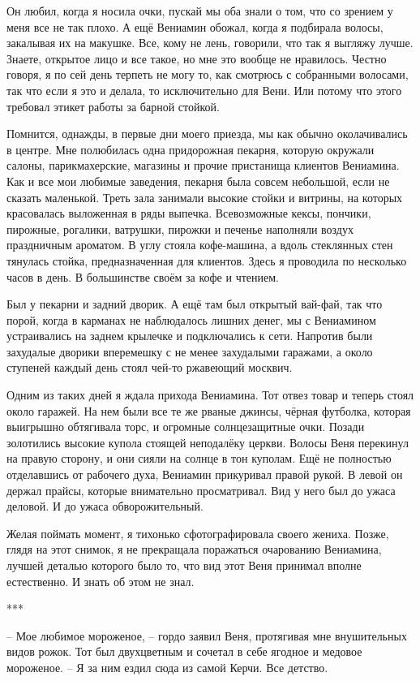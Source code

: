 \documentclass[
]{book}
\begin{document}
Он любил, когда я носила очки, пускай мы оба знали о том, что со зрением у меня все не так плохо. А ещё Вениамин обожал, когда я подбирала волосы, закалывая их на макушке. Все, кому не лень, говорили, что так я выгляжу лучше. Знаете, открытое лицо и все такое, но мне это вообще не нравилось. Честно говоря, я по сей день терпеть не могу то, как смотрюсь с собранными волосами, так что если я это и делала, то исключительно для Вени. Или потому что этого требовал этикет работы за барной стойкой.

Помнится, однажды, в первые дни моего приезда, мы как обычно околачивались в центре. Мне полюбилась одна придорожная пекарня, которую окружали салоны, парикмахерские, магазины и прочие пристанища клиентов Вениамина. Как и все мои любимые заведения, пекарня была совсем небольшой, если не сказать маленькой. Треть зала занимали высокие стойки и витрины, на которых красовалась выложенная в ряды выпечка. Всевозможные кексы, пончики, пирожные, рогалики, ватрушки, пирожки и печенье наполняли воздух праздничным ароматом. В углу стояла кофе-машина, а вдоль стеклянных стен тянулась стойка, предназначенная для клиентов. Здесь я проводила по несколько часов в день. В большинстве своём за кофе и чтением.

Был у пекарни и задний дворик. А ещё там был открытый вай-фай, так что порой, когда в карманах не наблюдалось лишних денег, мы с Вениамином устраивались на заднем крылечке и подключались к сети. Напротив были захудалые дворики вперемешку с не менее захудалыми гаражами, а около ступеней каждый день стоял чей-то ржавеющий москвич.

Одним из таких дней я ждала прихода Вениамина. Тот отвез товар и теперь стоял около гаражей. На нем были все те же рваные джинсы, чёрная футболка, которая выигрышно обтягивала торс, и огромные солнцезащитные очки. Позади золотились высокие купола стоящей неподалёку церкви. Волосы Веня перекинул на правую сторону, и они сияли на солнце в тон куполам. Ещё не полностью отделавшись от рабочего духа, Вениамин прикуривал правой рукой. В левой он держал прайсы, которые внимательно просматривал. Вид у него был до ужаса деловой. И до ужаса обворожительный.

Желая поймать момент, я тихонько сфотографировала своего жениха. Позже, глядя на этот снимок, я не прекращала поражаться очарованию Вениамина, лучшей деталью которого было то, что вид этот Веня принимал вполне естественно. И знать об этом не знал.

***

-- Мое любимое мороженое, -- гордо заявил Веня, протягивая мне внушительных видов рожок. Тот был двухцветным и сочетал в себе ягодное и медовое мороженое. -- Я за ним ездил сюда из самой Керчи. Все детство.
\end{document}
